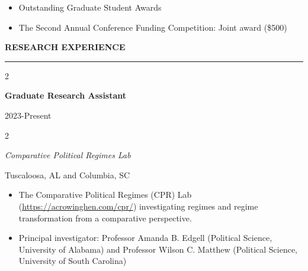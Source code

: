 \documentclass[
  16,
]{article}
\providecommand{\tightlist}{%
  \setlength{\itemsep}{0pt}\setlength{\parskip}{0pt}}
\begin{document}
\begin{itemize}
\tightlist
\item
  Outstanding Graduate Student Awards
\item
  The Second Annual Conference Funding Competition: Joint award (\$500)
\end{itemize}

\vspace{7pt}

\begin{large}{\bf RESEARCH EXPERIENCE}
  \vspace{3pt}
  \hrule
  \begin{multicols}{2}
    \begin{flushleft}{\bf Graduate Research Assistant}\end{flushleft}
    \begin{flushright}2023-Present\end{flushright}
  \end{multicols}
  \vspace{-0.17cm}
  \begin{multicols}{2}
    \begin{flushleft}\textit{Comparative Political Regimes Lab}\end{flushleft}
    \begin{flushright}Tuscaloosa, AL and Columbia, SC\end{flushright}
  \end{multicols}
  \end{large}
\vspace{-0.16cm}

\begin{itemize}
\tightlist
\item
  The Comparative Political Regimes (CPR) Lab
  (\href{https://acrowinghen.com/cpr/}{\ttfamily https://acrowinghen.com/cpr/})
  investigating regimes and regime transformation from a comparative
  perspective.
\item
  Principal investigator: Professor Amanda B. Edgell (Political Science,
  University of Alabama) and Professor Wilson C. Matthew (Political
  Science, University of South Carolina)
\end{itemize}
\end{document}
